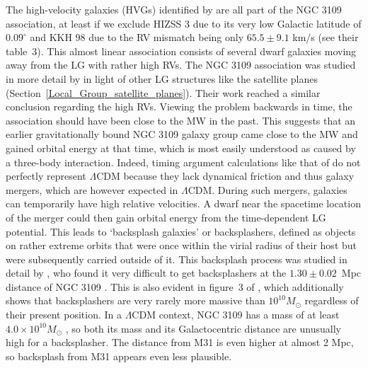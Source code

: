 \documentclass[fleqn,usenatbib,useAMS]{mnras} %
\begin{document}
The high-velocity galaxies (HVGs) identified by \citet{Banik_2018_anisotropy} are all part of the NGC 3109 association, at least if we exclude HIZSS 3 due to its very low Galactic latitude of $0.09^\circ$ and KKH 98 due to the RV mismatch being only $65.5 \pm 9.1$ km/s (see their table~3). This almost linear association \citep{Bellazzini_2013} consists of several dwarf galaxies moving away from the LG with rather high RVs. The NGC 3109 association was studied in more detail by \citet{Pawlowski_McGaugh_2014} in light of other LG structures like the satellite planes (Section~\ref{Local_Group_satellite_planes}). Their work reached a similar conclusion regarding the high RVs. Viewing the problem backwards in time, the association should have been close to the MW in the past. This suggests that an earlier gravitationally bound NGC 3109 galaxy group came close to the MW and gained orbital energy at that time, which is most easily understood as caused by a three-body interaction. Indeed, timing argument calculations like that of \citet{Banik_2018_anisotropy} do not perfectly represent $\Lambda$CDM because they lack dynamical friction and thus galaxy mergers, which are however expected in $\Lambda$CDM. During such mergers, galaxies can temporarily have high relative velocities. A dwarf near the spacetime location of the merger could then gain orbital energy from the time-dependent LG potential. This leads to `backsplash galaxies' or backsplashers, defined as objects on rather extreme orbits that were once within the virial radius of their host but were subsequently carried outside of it. This backsplash process was studied in detail by \citet{Sales_2007}, who found it very difficult to get backsplashers at the $1.30 \pm 0.02$~Mpc distance of NGC 3109 \citep{Soszynski_2006}. This is also evident in figure~3 of \citet{Teyssier_2012}, which additionally shows that backsplashers are very rarely more massive than $10^{10} M_\odot$ regardless of their present position. In a $\Lambda$CDM context, NGC 3109 has a mass of at least $4.0 \times 10^{10} M_\odot$ \citep{Li_2020}, so both its mass and its Galactocentric distance are unusually high for a backsplasher. The distance from M31 is even higher at almost 2 Mpc, so backsplash from M31 appears even less plausible.
\end{document}
